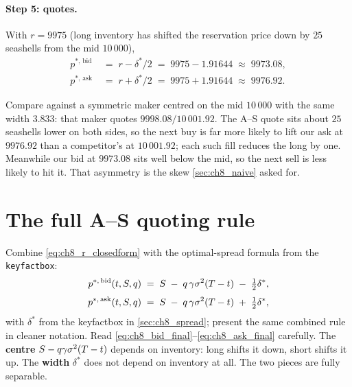 \paragraph{Step 5: quotes.}
With $r = 9975$ (long inventory has shifted the reservation price
down by $25$ seashells from the mid $10\,000$),
\begin{align}
  p^{*,\,\mathrm{bid}}
  \;&=\; r - \delta^*/2
  \;=\; 9975 - 1.91644
  \;\approx\; 9973.08, \label{eq:ch8_numerical_bid}\\[0.3em]
  p^{*,\,\mathrm{ask}}
  \;&=\; r + \delta^*/2
  \;=\; 9975 + 1.91644
  \;\approx\; 9976.92. \label{eq:ch8_numerical_ask}
\end{align}

Compare against a symmetric maker centred on the mid $10\,000$ with
the same width $3.833$: that maker quotes $9998.08 / 10\,001.92$.
The A--S quote sits about $25$ seashells lower on both sides, so
the next buy is far more likely to lift our ask at $9976.92$ than a
competitor's at $10\,001.92$; each such fill reduces the long by
one. Meanwhile our bid at $9973.08$ sits well below the mid, so the
next sell is less likely to hit it. That asymmetry is the skew
\cref{sec:ch8_naive} asked for.

\section{The full A--S quoting rule}
\label{sec:ch8_full_rule}

Combine \eqref{eq:ch8_r_closedform} with the optimal-spread
formula from the  \texttt{keyfactbox}:
\begin{align}
  p^{*,\,\mathrm{bid}}(t, S, q)
  \;&=\; S
         \;-\; q\,\gamma\sigma^2(T - t)
         \;-\; \tfrac{1}{2}\delta^*, \label{eq:ch8_bid_final} \\[0.3em]
  p^{*,\,\mathrm{ask}}(t, S, q)
  \;&=\; S
         \;-\; q\,\gamma\sigma^2(T - t)
         \;+\; \tfrac{1}{2}\delta^*, \label{eq:ch8_ask_final}
\end{align}
with $\delta^*$ from the keyfactbox in \cref{sec:ch8_spread};
\citeCartea{} present the same combined rule in cleaner notation.
Read \eqref{eq:ch8_bid_final}--\eqref{eq:ch8_ask_final} carefully.
The \textbf{centre} $S - q\gamma\sigma^2(T - t)$
depends on inventory: long shifts it down, short shifts it up. The
\textbf{width} $\delta^*$ does not depend on inventory at all. The
two pieces are fully separable.

